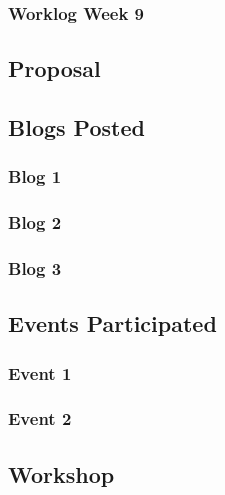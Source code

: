 \subsubsection{Worklog Week 9}


\newpage

\subsection{Proposal}



\newpage

\subsection{Blogs Posted}

\subsubsection{Blog 1}


\subsubsection{Blog 2}


\subsubsection{Blog 3}


\newpage

\subsection{Events Participated}

\subsubsection{Event 1}


\subsubsection{Event 2}


\newpage

\subsection{Workshop}

